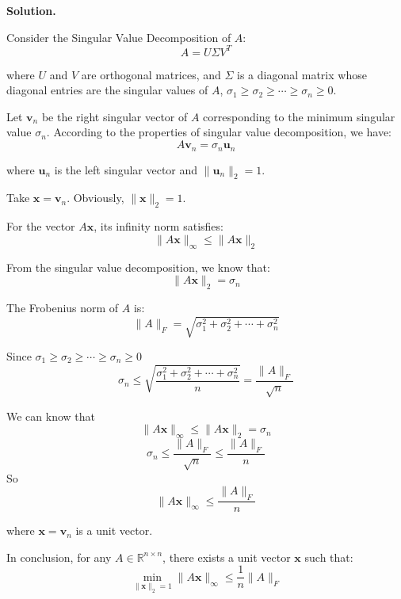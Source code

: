 \documentclass[12pt, a4paper, oneside]{ctexart}
\newenvironment{solution}{\par\noindent\textbf{Solution. }}{\par}
\begin{document}
\begin{solution}

Consider the Singular Value Decomposition of $ A $:
$$
A = U\Sigma V^T
$$

where $ U $ and $ V $ are orthogonal matrices, and $ \Sigma $ is a diagonal matrix whose diagonal entries are the singular values of $ A $, $ \sigma_1 \geq \sigma_2 \geq \cdots \geq \sigma_n \geq 0 $.

Let $ \mathbf{v}_n $ be the right singular vector of $ A $ corresponding to the minimum singular value $ \sigma_n $. According to the properties of singular value decomposition, we have:
$$
A\mathbf{v}_n = \sigma_n \mathbf{u}_n
$$

where $ \mathbf{u}_n $ is the left singular vector and $ \|\mathbf{u}_n\|_2 = 1 $.

Take $ \mathbf{x} = \mathbf{v}_n $. Obviously, $ \|\mathbf{x}\|_2 = 1 $.

For the vector $ A\mathbf{x} $, its infinity norm satisfies:
$$
\|A\mathbf{x}\|_\infty \leq \|A\mathbf{x}\|_2
$$

From the singular value decomposition, we know that:
$$
\|A\mathbf{x}\|_2 = \sigma_n
$$

The Frobenius norm of $ A $ is:
$$
\|A\|_F = \sqrt{\sigma_1^2 + \sigma_2^2 + \cdots + \sigma_n^2}
$$

Since $ \sigma_1 \geq \sigma_2 \geq \cdots \geq \sigma_n \geq 0 $
$$
\sigma_n \leq \sqrt{\frac{\sigma_1^2 + \sigma_2^2 + \cdots + \sigma_n^2}{n}} = \frac{\|A\|_F}{\sqrt{n}}
$$

We can know that
$$
\|A\mathbf{x}\|_\infty \leq \|A\mathbf{x}\|_2 = \sigma_n
$$
$$
\sigma_n \leq \frac{\|A\|_F}{\sqrt{n}} \leq \frac{\|A\|_F}{n}
$$
So
$$
\|A\mathbf{x}\|_\infty \leq \frac{\|A\|_F}{n}
$$

where $ \mathbf{x} = \mathbf{v}_n $ is a unit vector.

In conclusion, for any $ A \in \mathbb{R}^{n \times n} $, there exists a unit vector $ \mathbf{x} $ such that:
$$
\min_{\|\mathbf{x}\|_2 = 1} \|A\mathbf{x}\|_\infty \leq \frac{1}{n}\|A\|_F
$$

\end{solution}
\end{document}
